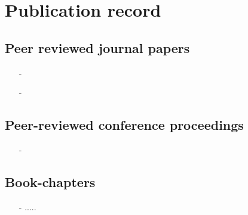 \section{Publication record}
\subsection{Peer reviewed journal papers}
\begin{itemize}
	\item[-] \cite{dummy_journal1}
	\item[-] \cite{dummy_journal2}
\end{itemize}
\subsection{Peer-reviewed conference proceedings}
\begin{itemize}
	\item[-] \cite{dummy_conference1}
\end{itemize}
\subsection{Book-chapters}
\begin{itemize}
	\item[-] .....
\end{itemize}